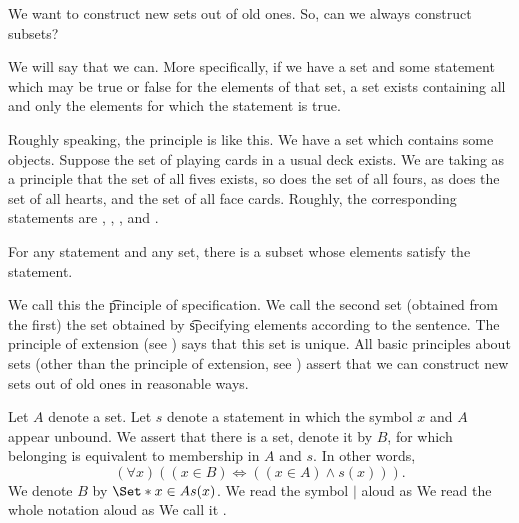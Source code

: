 

We want to construct new sets out of old ones.
So, can we always construct subsets?


We will say that we can.
More specifically, if we have a set and some statement which may be true or false for the elements of that set, a set exists containing all and only the elements for which the statement is true.

Roughly speaking, the principle is like this.
We have a set which contains some objects.
Suppose the set of playing cards in a usual deck exists.
We are taking as a principle that the set of all fives exists, so does the set of all fours, as does the set of all hearts, and the set of all face cards.
Roughly, the corresponding statements are , , , and .

\begin{principle}[Specification]
	For any statement and any set, there is a subset whose elements satisfy the statement.
\end{principle}

We call this the \t{principle of specification}.
We call the second set (obtained from the first) the set obtained by \t{specifying} elements according to the sentence.
The principle of extension (see ) says that this set is unique.
All  basic principles about sets (other than the principle of extension, see ) assert that we can construct new sets out of old ones in reasonable ways.



Let $A$ denote a set.
Let $s$ denote a statement in which the symbol $x$ and $A$ appear unbound.
We assert that there is a set, denote it by $B$, for which belonging is equivalent to membership in $A$ and $s$.
In other words,
\[
	(\forall x)((x \in B) \iff ((x \in A) \land s(x))).
\]
We denote $B$ by $\Set*{x \in A}{s(x)}$.
We read the symbol $\mid$ aloud as 
We read the whole notation aloud as 
We call it .



